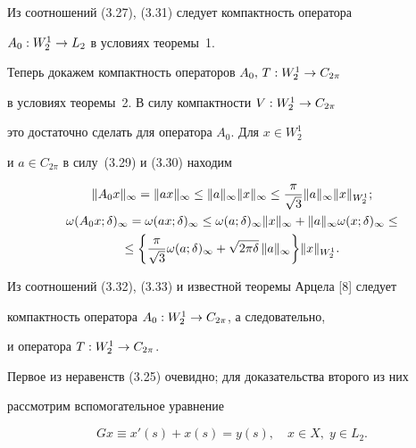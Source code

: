 Из соотношений (3.27), (3.31) следует компактность оператора


$A_0 : W_2^1 \to L_2$ в условиях теоремы~1.





Теперь докажем компактность операторов $A_0,\,T : W_2^1 \to C_{2\pi}$


в условиях теоремы~2. В силу компактности $V : W_2^1 \to C_{2\pi}$


это достаточно сделать для оператора $A_0$. Для $x\in W_2^1$


и $a\in C_{2\pi}$ в силу~(3.29) и (3.30) находим


\begin{gather}


\|A_0x\|_{\infty} =\|ax\|_{{\infty}}


\leq \|a\|_{\infty} \|x\|_{\infty} \leq


\frac{\pi}{\sqrt{3}}\|a\|_{\infty}\|x\|_{W_2^1} ; \\


%


\omega(A_0x;\delta)_{\infty} =\omega(ax;\delta)_{\infty}


\leq \omega(a;\delta)_{\infty}


\|x\|_{\infty} +\|a\|_{\infty} \omega(x;\delta)_{\infty} \leq \notag \\


%


\le\bigg\{ \frac{\pi}{\sqrt{3}} \omega(a;\delta)_{\infty} +


\sqrt{2\pi\delta}\,\|a\|_{\infty}\bigg\} \|x\|_{{W_2^1}} .


\end{gather}


Из соотношений (3.32), (3.33) и известной теоремы Арцела [8] следует


компактность оператора $A_0 : W_2^1 \to C_{2\pi}$, а следовательно,


и оператора $T : W_2^1 \to C_{2\pi}$.





Первое из неравенств (3.25) очевидно; для доказательства второго из них


рассмотрим вспомогательное уравнение


\begin{equation}


Gx\equiv x'(s)+x(s)=y(s),\quad x\in X,\; y\in L_2.


\end{equation}


